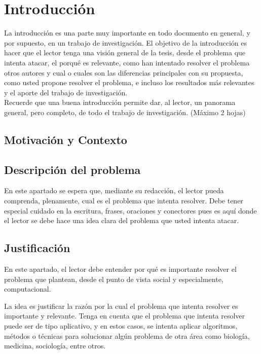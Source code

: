 \chapter{Introducción}

\cite{citacion1}

La introducción es una parte muy importante en todo documento en general, y por supuesto, en un trabajo de investigación. El objetivo de la introducción es hacer que el lector tenga una visión general de la tesis, desde el problema que intenta atacar, el porqué es relevante, como han intentado resolver el problema otros autores y cual o cuales son las diferencias principales con su propuesta, como usted propone resolver el problema,  e incluso los resultados más relevantes y el aporte del trabajo de investigación. \\

Recuerde que una buena introducción permite dar, al lector, un panorama general, pero completo, de todo el trabajo de investigación. (Máximo 2 hojas)

\section{Motivación y Contexto}


\section{Descripción del  problema}
En este apartado se espera que, mediante su redacción,   el lector pueda  comprenda, plenamente, cual es el problema que intenta resolver. Debe tener especial cuidado en la escritura, frases, oraciones y conectores pues es aquí donde el lector  se debe hace  una idea clara  del problema que usted intenta atacar.   

\section{Justificación}
En este apartado, el lector debe entender por qué es importante resolver el problema que plantean, desde el punto de vista social y especialmente, computacional. 

La idea es  justificar la razón por la cual  el problema que intenta resolver es importante y relevante. 
Tenga en cuenta que el problema que intenta resolver puede ser de tipo aplicativo, y  en estos casos, se intenta aplicar algoritmos, métodos o técnicas para solucionar algún problema de otra área como
biología, medicina, sociología, entre otros. \\

